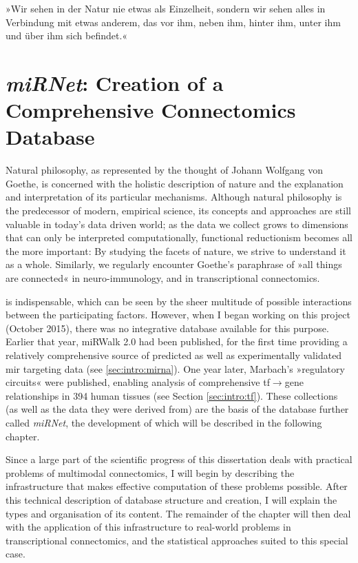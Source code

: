 \begin{savequote}[75mm]
»Wir sehen in der Natur nie etwas als Einzelheit, sondern wir sehen alles in Verbindung mit etwas anderem, das vor ihm, neben ihm, hinter ihm, unter ihm und über ihm sich befindet.«
\end{savequote}

\chapter[miRNet: Creation of a Comprehensive Connectomics Database]{\textit{miRNet}: Creation of a\\Comprehensive Connectomics Database} \label{sec:database:mirnet}
Natural philosophy, as represented by the thought of Johann Wolfgang von Goethe, is concerned with the holistic description of nature and the explanation and interpretation of its particular mechanisms. Although natural philosophy is the predecessor of modern, empirical science, its concepts and approaches are still valuable in today's data driven world; as the data we collect grows to dimensions that can only be interpreted computationally, functional reductionism becomes all the more important: By studying the facets of nature, we strive to understand it as a whole. Similarly, we regularly encounter Goethe's paraphrase of »all things are connected« in neuro-immunology, and in transcriptional connectomics.

 is indispensable, which can be seen by the sheer multitude of possible interactions between the participating factors. However, when I began working on this project (October 2015), there was no integrative database available for this purpose. Earlier that year, miRWalk 2.0 had been published, for the first time providing a relatively comprehensive source of predicted as well as experimentally validated \ac{mir} targeting data\cite{Dweep2015} (see \ref{sec:intro:mirna}). One year later, Marbach's »regulatory circuits« were published,\cite{Marbach2016} enabling analysis of comprehensive \ac{tf}$\to$gene relationships in 394 human tissues (see Section \ref{sec:intro:tf}). These collections (as well as the data they were derived from) are the basis of the database further called \textit{miRNet}, the development of which will be described in the following chapter.

Since a large part of the scientific progress of this dissertation deals with practical problems of multimodal connectomics, I will begin by describing the infrastructure that makes effective computation of these problems possible. After this technical description of database structure and creation, I will explain the types and organisation of its content. The remainder of the chapter will then deal with the application of this infrastructure to real-world problems in transcriptional connectomics, and the statistical approaches suited to this special case.

